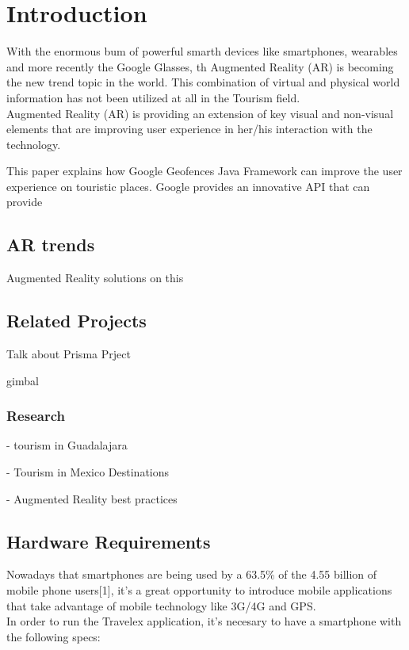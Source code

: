 \section{Introduction}
With the enormous bum of powerful smarth devices like smartphones, wearables and more
recently the Google Glasses, th Augmented Reality (AR) is becoming the new trend topic
in the world. This combination of virtual and physical world information has not been
utilized at all in the Tourism field. \\

Augmented Reality (AR) is providing an extension of key visual and non-visual elements
that are improving user experience in her/his interaction with the technology. 

This paper explains how Google Geofences Java Framework can improve the user experience
on touristic places. Google provides an innovative API that can provide 


\subsection{AR trends}
Augmented Reality solutions on this

\subsection{Related Projects}
Talk about Prisma Prject

gimbal


\subsubsection{Research}
- tourism in Guadalajara

- Tourism in Mexico Destinations

- Augmented Reality best practices

\subsection{Hardware Requirements}
Nowadays that smartphones are being used by a 63.5\% of  the 4.55 billion of mobile phone users[1], it's a great 
opportunity to introduce mobile applications that take advantage of mobile technology like 3G/4G and GPS. \\

In order to run the Travelex application, it's necesary to have a smartphone with the following specs:

